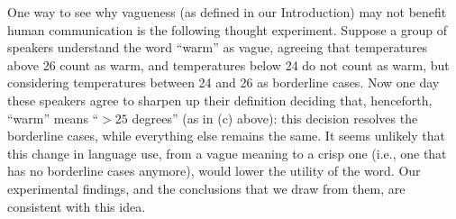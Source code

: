 One way to see why vagueness (as defined in our Introduction) may not benefit human communication is the following thought experiment. Suppose a group of speakers understand the word ``warm'' as vague, agreeing that temperatures above 26 count as warm, and temperatures below 24 do not count as warm, but considering temperatures between 24 and 26 as borderline cases. Now one day these speakers agree to sharpen up their definition deciding that, henceforth, ``warm'' means ``$>25$ degrees'' (as in (c) above): this decision resolves the borderline cases, while everything else remains the same. It seems unlikely that this change in language use, from a vague meaning to a crisp one (i.e., one that has no borderline cases anymore), would lower the utility of the word. Our experimental findings,
and the conclusions that we draw from them, are consistent with this idea.
